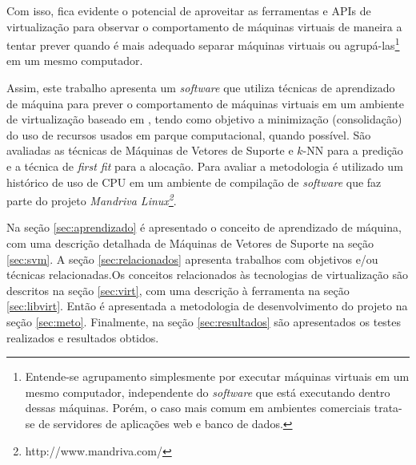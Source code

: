 Com isso, fica evidente o potencial de aproveitar as ferramentas e APIs de
virtualização para observar o comportamento de máquinas virtuais de maneira
a tentar prever quando é mais adequado separar máquinas virtuais ou
agrupá-las\footnote{Entende-se agrupamento simplesmente por
executar máquinas virtuais em um mesmo computador, independente do
\emph{software}
que está executando dentro dessas máquinas. Porém, o caso mais comum em
ambientes comerciais trata-se de servidores de aplicações web e banco de
dados.} em um mesmo computador. 

Assim, este trabalho apresenta um \emph{software} que utiliza técnicas de
aprendizado de máquina para prever o comportamento de máquinas
virtuais em um ambiente de virtualização baseado em \libvirt{}, tendo como
objetivo a minimização (consolidação) do uso de recursos usados em parque
computacional, quando possível. São avaliadas as técnicas de Máquinas de
Vetores de Suporte e $k$-NN para a predição e a técnica de \emph{first fit} para
a alocação. Para avaliar a metodologia é utilizado um histórico de uso de CPU
em um ambiente de compilação de \emph{software} que faz parte do projeto \emph{Mandriva
Linux\footnote{http://www.mandriva.com/}}.

Na seção \ref{sec:aprendizado} é apresentado o conceito de aprendizado de
máquina, com uma descrição detalhada de Máquinas de Vetores de Suporte na seção
\ref{sec:svm}. A seção \ref{sec:relacionados} apresenta trabalhos com objetivos
e/ou técnicas relacionadas.Os conceitos relacionados às tecnologias de
virtualização são descritos na seção \ref{sec:virt}, com uma descrição à
ferramenta \libvirt{} na seção \ref{sec:libvirt}. Então é apresentada a
metodologia de desenvolvimento do projeto na seção \ref{sec:meto}. Finalmente,
na seção \ref{sec:resultados} são apresentados os testes realizados e resultados
obtidos.
